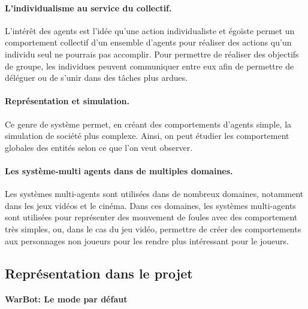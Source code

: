 \documentclass{report}
\begin{document}
\paragraph{L'individualisme au service du collectif.}L’intérêt des agents est l'idée qu'une action individualiste et égoïste permet un comportement collectif d'un ensemble d'agents pour réaliser des actions qu'un individu seul ne pourrais pas accomplir. Pour permettre de réaliser des objectifs de groupe, les individues peuvent communiquer entre eux afin de permettre de déléguer ou de s'unir dans des tâches plus ardues.
\paragraph{Représentation et simulation.}Ce genre de système permet, en créant des comportements d'agents simple, la simulation de société plus complexe. Ainsi, on peut étudier les comportement globales des entités selon ce que l'on veut observer.
\paragraph{Les système-multi agents dans de multiples domaines.} Les systèmes multi-agents sont utilisées dans de nombreux domaines, notamment dans les jeux vidéos et le cinéma. Dans ces domaines, les systèmes multi-agents  sont utilisées pour représenter des mouvement de foules avec des comportement très simples, ou, dans le cas du jeu vidéo, permettre de créer des comportements aux personnages non joueurs pour les rendre plus intéressant pour le joueurs.


\subsection{Représentation dans le projet}

\paragraph{WarBot: Le mode par défaut}
\end{document}
